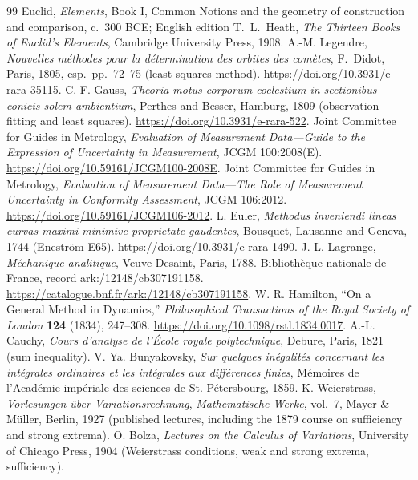\documentclass[11pt,letterpaper]{article}
\theoremstyle{definition}\newtheorem{definition}{Definition}
\begin{document}
\begin{thebibliography}{99}\setlength{\itemsep}{0.12em}
 Euclid, \emph{Elements}, Book I, Common Notions and the geometry of construction and comparison, c.~300 BCE; English edition T.~L.~Heath, \emph{The Thirteen Books of Euclid's Elements}, Cambridge University Press, 1908.
 A.-M. Legendre, \emph{Nouvelles m\'ethodes pour la d\'etermination des orbites des com\`etes}, F.~Didot, Paris, 1805, esp.~pp.~72--75 (least-squares method). \url{https://doi.org/10.3931/e-rara-35115}.
 C. F. Gauss, \emph{Theoria motus corporum coelestium in sectionibus conicis solem ambientium}, Perthes and Besser, Hamburg, 1809 (observation fitting and least squares). \url{https://doi.org/10.3931/e-rara-522}.
 Joint Committee for Guides in Metrology, \emph{Evaluation of Measurement Data---Guide to the Expression of Uncertainty in Measurement}, JCGM 100:2008(E). \url{https://doi.org/10.59161/JCGM100-2008E}.
 Joint Committee for Guides in Metrology, \emph{Evaluation of Measurement Data---The Role of Measurement Uncertainty in Conformity Assessment}, JCGM 106:2012. \url{https://doi.org/10.59161/JCGM106-2012}.
 L. Euler, \emph{Methodus inveniendi lineas curvas maximi minimive proprietate gaudentes}, Bousquet, Lausanne and Geneva, 1744 (Enestr\"om E65). \url{https://doi.org/10.3931/e-rara-1490}.
 J.-L. Lagrange, \emph{M\'echanique analitique}, Veuve Desaint, Paris, 1788. Biblioth\`eque nationale de France, record ark:/12148/cb307191158. \url{https://catalogue.bnf.fr/ark:/12148/cb307191158}.
 W. R. Hamilton, ``On a General Method in Dynamics,'' \emph{Philosophical Transactions of the Royal Society of London} \textbf{124} (1834), 247--308. \url{https://doi.org/10.1098/rstl.1834.0017}.
 A.-L. Cauchy, \emph{Cours d'analyse de l'\'Ecole royale polytechnique}, Debure, Paris, 1821 (sum inequality). 
 V. Ya. Bunyakovsky, \emph{Sur quelques in\'egalit\'es concernant les int\'egrales ordinaires et les int\'egrales aux diff\'erences finies}, M\'emoires de l'Acad\'emie imp\'eriale des sciences de St.-P\'etersbourg, 1859.
 K. Weierstrass, \emph{Vorlesungen \"uber Variationsrechnung}, \emph{Mathematische Werke}, vol.~7, Mayer \& M\"uller, Berlin, 1927 (published lectures, including the 1879 course on sufficiency and strong extrema).
 O. Bolza, \emph{Lectures on the Calculus of Variations}, University of Chicago Press, 1904 (Weierstrass conditions, weak and strong extrema, sufficiency).

\end{thebibliography}
\end{document}
